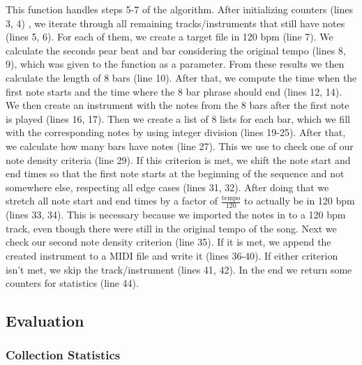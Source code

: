 \documentclass[a4paper,12pt]{extarticle}
\begin{document}
This function handles steps 5-7 of the algorithm.
After initializing counters (lines 3, 4) , we iterate through all remaining tracks/instruments that still have notes (lines 5, 6). For each of them, we create a target file in 120 bpm (line 7). We calculate the seconds pear beat and bar considering the original tempo (lines 8, 9), which was given to the function as a parameter. From these results we then calculate the length of 8 bars (line 10). After that, we compute the time when the first note starts and the time where the 8 bar phrase should end (lines 12, 14). We then create an instrument with the notes from the 8 bars after the first note is played (lines 16, 17). Then we create a list of 8 lists for each bar, which we fill with the corresponding notes by using integer division (lines 19-25). After that, we calculate how many bars have notes (line 27). This we use to check one of our note density criteria (line 29). If this criterion is met, we shift the note start and end times so that the first note starts at the beginning of the sequence and not somewhere else, respecting all edge cases (lines 31, 32). 
After doing that we stretch all note start and end times by a factor of $\frac{\text{tempo}}{120}$ to actually be in 120 bpm (lines 33, 34). This is necessary because we imported the notes in to a 120 bpm track, even though there were still in the original tempo of the song. Next we check our second note density criterion (line 35). If it is met, we append the created instrument to a MIDI file and write it (lines 36-40). If either criterion isn't met, we skip the track/instrument (lines 41, 42). In the end we return some counters for statistics (line 44).


\subsection{Evaluation}
\subsubsection{Collection Statistics}
\end{document}
